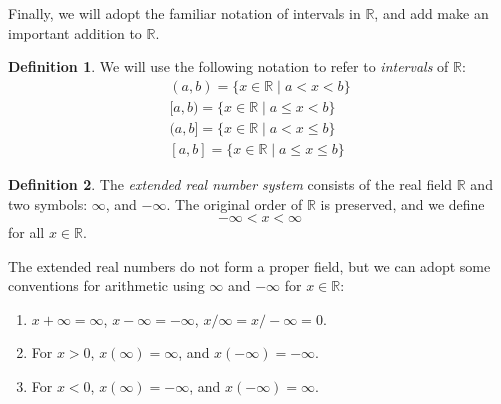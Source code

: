 \documentclass{article}
\newcommand{\R}{\mathbb{R}}
\theoremstyle{definition}
\newtheorem{definition}{Definition}[section]
\begin{document}
Finally, we will adopt the familiar notation of intervals in $ \R $, and add make an important addition to $ \R $. 
\begin{definition}
	We will use the following notation to refer to \textit{\color{red} intervals} of $ \R $:
	\begin{align*}
		(a,b)=\{x\in\R\mid a<x<b\}\\
		[a,b)=\{x\in\R\mid a\le x<b\}\\
		(a,b]=\{x\in\R\mid a<x\le b\}\\
		[a,b]=\{x\in\R\mid a\le x\le b\}
	\end{align*}
\end{definition}
\begin{definition}
	The \textit{\color{red}extended real number system} consists of the real field $ \R $ and two symbols: $ \infty $, and $ -\infty $. The original order of $ \R $ is preserved, and we define $$ -\infty <x<\infty$$ for all $ x\in\R $. 
\end{definition}
The extended real numbers do not form a proper field, but we can adopt some conventions for arithmetic using $ \infty $ and $ -\infty $ for $ x\in\R $:
\begin{enumerate}
	\item $ x+\infty=\infty $, $ x-\infty=-\infty $, $ x/\infty=x/-\infty=0 $. 
	\item For $ x>0 $, $ x(\infty)=\infty $, and $ x(-\infty)=-\infty $.
	\item For $ x<0 $, $ x(\infty)=-\infty $, and $ x(-\infty)=\infty $.
\end{enumerate}
\end{document}
